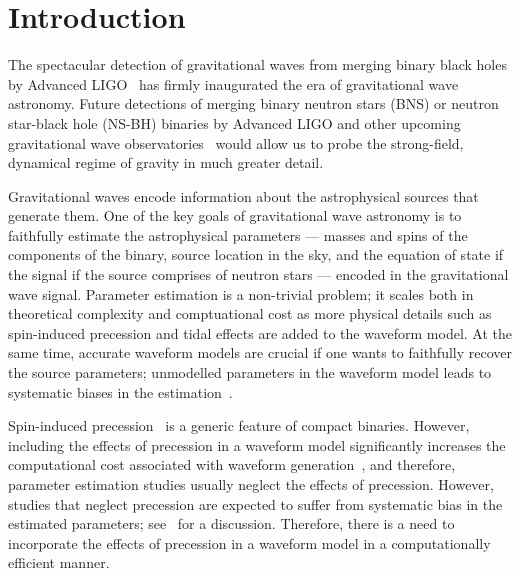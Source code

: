 \chapter{Introduction}

The spectacular detection of gravitational waves from merging binary black holes
by Advanced LIGO~\cite{Event_0, Event_2} has firmly inaugurated the era of
gravitational wave astronomy. Future detections of merging binary neutron stars
(BNS) or neutron star-black hole (NS-BH) binaries by Advanced LIGO and other
upcoming  gravitational wave observatories~\cite{KAGRA, Virgo, LIGO_india} would
allow us to probe the strong-field, dynamical regime of gravity in much greater
detail.

Gravitational waves encode information about the astrophysical sources that
generate them. One of the key goals of gravitational  wave astronomy is to
faithfully estimate the astrophysical parameters --- masses and spins of the
components of the binary, source location in the sky, and the equation of state
if the signal if the source comprises of neutron stars --- encoded in the
gravitational wave signal. Parameter estimation is a non-trivial  problem; it
scales both in theoretical complexity and comptuational cost as more physical
details such as spin-induced precession and tidal effects are added to the
waveform model. At the same time, accurate waveform models are crucial if one
wants to faithfully recover the source parameters; unmodelled parameters in the
waveform model leads to systematic biases in the estimation~\cite{Bias_1,
Bias_2}.

Spin-induced precession~\cite{Apostolatos1994} is a generic feature of compact
binaries.  However, including the effects of precession in a waveform model
significantly increases the computational cost associated with waveform
generation~\cite{PE_cost}, and therefore, parameter estimation studies usually
neglect the effects of precession. However, studies that neglect precession are
expected to suffer from systematic bias in the estimated parameters;
see~\cite{Bias_1, Bias_3}  for a discussion. Therefore, there is a need to
incorporate the effects of precession in a waveform model in a computationally
efficient manner.

